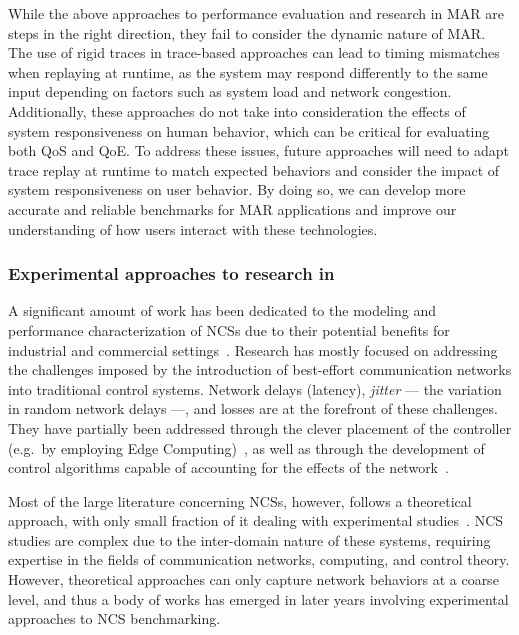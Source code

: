 While the above approaches to performance evaluation and research in \gls{MAR} are steps in the right direction, they fail to consider the dynamic nature of \gls{MAR}.
The use of rigid traces in trace-based approaches can lead to timing mismatches when replaying at runtime, as the system may respond differently to the same input depending on factors such as system load and network congestion.
Additionally, these approaches do not take into consideration the effects of system responsiveness on human behavior, which can be critical for evaluating both \gls{QoS} and \gls{QoE}.
To address these issues, future approaches will need to adapt trace replay at runtime to match expected behaviors and consider the impact of system responsiveness on user behavior.
By doing so, we can develop more accurate and reliable benchmarks for \gls{MAR} applications and improve our understanding of how users interact with these technologies.

\subsubsection{Experimental approaches to research in }

A significant amount of work has been dedicated to the modeling and performance characterization of \glspl{NCS} due to their potential benefits for industrial and commercial settings~\cite{lu2016real,hespanha2007survey,zhang2013network,zhang2016survey}.
Research has mostly focused on addressing the challenges imposed by the introduction of best-effort communication networks into traditional control systems.
Network delays (latency), \emph{jitter} --- the variation in random network delays ---, and losses are at the forefront of these challenges.
They have partially been addressed through the clever placement of the controller (e.g.\ by employing Edge Computing)~\cite{sasaki2017layered,sasaki2016vehicle}, as well as through the development of control algorithms capable of accounting for the effects of the network~\cite{zhang2013network}.

Most of the large literature concerning \glspl{NCS}, however, follows a theoretical approach, with only small fraction of it dealing with experimental studies~\cite{zhang2019networked}.
\gls{NCS} studies are complex due to the inter-domain nature of these systems, requiring expertise in the fields of communication networks, computing, and control theory.
However, theoretical approaches can only capture network behaviors at a coarse level, and thus a body of works has emerged in later years involving experimental approaches to \gls{NCS} benchmarking.

